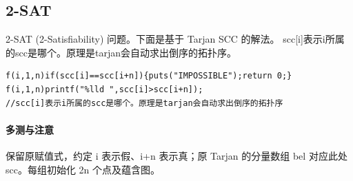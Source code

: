 \subsection{2-SAT}
2-SAT (2-Satisfiability) 问题。下面是基于 Tarjan SCC 的解法。
scc[i]表示i所属的scc是哪个。原理是tarjan会自动求出倒序的拓扑序。
\begin{lstlisting}
f(i,1,n)if(scc[i]==scc[i+n]){puts("IMPOSSIBLE");return 0;}
f(i,1,n)printf("%lld ",scc[i]>scc[i+n]);
//scc[i]表示i所属的scc是哪个。原理是tarjan会自动求出倒序的拓扑序
\end{lstlisting}

\paragraph{多测与注意} 保留原赋值式，约定 i 表示假、i+n 表示真；原 Tarjan 的分量数组 bel 对应此处 scc。每组初始化 2n 个点及蕴含图。

\newpage

